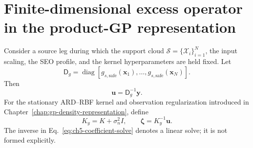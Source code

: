 \documentclass[
  11pt,
  letterpaper,
  onehalfspacing,
  normalmargins,
  equalmargins,
  oneside
]{ut-thesis}
\begin{document}
\section{Finite-dimensional excess operator in the product-GP representation}
\label{sec:ch5-finite-excess-operator}

Consider a source leg during which the support cloud
\(\mathcal S=\{\boldsymbol{\mathcal X}_i\}_{i=1}^{N}\), the input scaling,
the SEO profile, and the kernel hyperparameters are held fixed. Let
\begin{equation}
\mathsf D_g
=
\operatorname{diag}
\left[
 g_{s,\mathrm{safe}}(\mathbf x_1),\ldots,
 g_{s,\mathrm{safe}}(\mathbf x_N)
\right].
\label{eq:ch5-safe-profile-matrix}
\end{equation}
Then
\begin{equation}
\mathbf u
=
\mathsf D_g^{-1}\mathbf y.
\label{eq:ch5-label-transform-matrix}
\end{equation}
For the stationary ARD--RBF kernel and observation regularization introduced
in Chapter~\ref{chap:gp-density-representation}, define
\begin{equation}
K_y
=
K+\sigma_n^2I,
\qquad
\boldsymbol\zeta
=
K_y^{-1}\mathbf u.
\label{eq:ch5-coefficient-solve}
\end{equation}
The inverse in Eq.~\eqref{eq:ch5-coefficient-solve} denotes a linear solve; it
is not formed explicitly.
\end{document}
